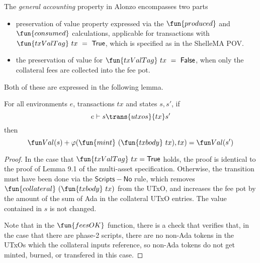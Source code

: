 \begin{property}
  \label{prop:pov}
  The \emph{general accounting} property in Alonzo encompasses two parts
  \begin{itemize}
    \item preservation of value property expressed via the $\fun{produced}$ and $\fun{consumed}$
    calculations, applicable for transactions with $\fun{txValTag}~tx~=~\True$, which
    is specified as in the ShelleMA POV.
    \item the preservation of value for $\fun{txValTag}~tx~=~\False$, when
    only the collateral fees are collected into the fee pot.
  \end{itemize}

Both of these are expressed in the following lemma.

\begin{lemma}
  For all environments $e$, transactions $tx$ and states $s, s'$, if
  \begin{equation*}
    e\vdash s\trans{utxos}{tx}s'
  \end{equation*}
  then
  \begin{equation*}
    \Val(s) + \varphi(\fun{mint}~(\fun{txbody}~tx), tx) = \Val(s')
  \end{equation*}
\end{lemma}

\begin{proof}
  In the case that $\fun{txValTag}~tx = \True$ holds, the proof is
  identical to the proof of Lemma 9.1 of the multi-asset
  specification. Otherwise, the transition must have been done via the
  $\mathsf{Scripts-No}$ rule, which removes
  $\fun{collateral}~(\fun{txbody}~tx)$ from the UTxO, and increases the fee pot by the amount of the sum of Ada in the
  collateral UTxO entries. The value contained in $s$ is not changed.

  Note that in the $\fun{feesOK}$ function, there is a check that verifies
  that, in the case that there are phase-2 scripts, there are no non-Ada tokens in the UTxOs
  which the collateral inputs reference, so non-Ada tokens do not get minted, burned, or transfered
  in this case.
\end{proof}
\end{property}

